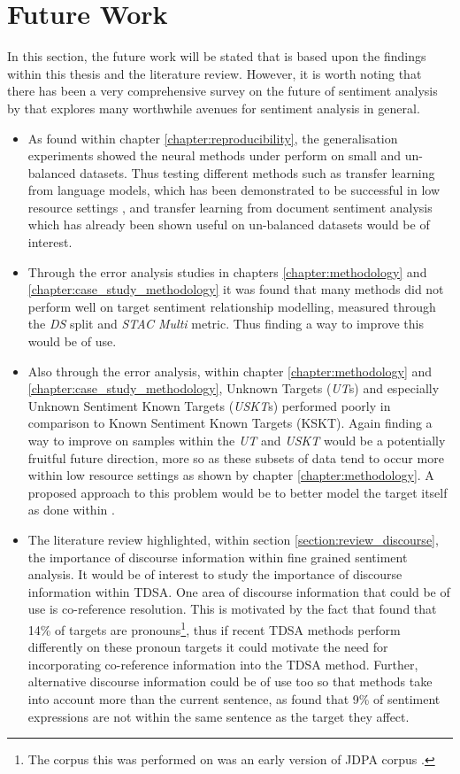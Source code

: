 \section{Future Work}
In this section, the future work will be stated that is based upon the findings within this thesis and the literature review. However, it is worth noting that there has been a very comprehensive survey on the future of sentiment analysis by \citet{poria2020beneath} that explores many worthwhile avenues for sentiment analysis in general.
\begin{itemize}
    \item As found within chapter \ref{chapter:reproducibility}, the generalisation experiments showed the neural methods under perform on small and un-balanced datasets. Thus testing different methods such as transfer learning from language models, which has been demonstrated to be successful in low resource settings \citep{howard-ruder-2018-universal}, and transfer learning from document sentiment analysis which has already been shown useful on un-balanced datasets \citep{he-etal-2018-exploiting} would be of interest.
    \item Through the error analysis studies in chapters \ref{chapter:methodology} and \ref{chapter:case_study_methodology} it was found that many methods did not perform well on target sentiment relationship modelling, measured through the \textit{DS} split and \textit{STAC Multi} metric. Thus finding a way to improve this would be of use.
    \item Also through the error analysis, within chapter \ref{chapter:methodology} and \ref{chapter:case_study_methodology}, Unknown Targets (\textit{UT}s) and especially Unknown Sentiment Known Targets (\textit{USKT}s) performed poorly in comparison to Known Sentiment Known Targets (KSKT). Again finding a way to improve on samples within the \textit{UT} and \textit{USKT} would be a potentially fruitful future direction, more so as these subsets of data tend to occur more within low resource settings as shown by chapter \ref{chapter:methodology}. A proposed approach to this problem would be to better model the target itself as done within \citet{he-etal-2018-effective}.
    \item The literature review highlighted, within section \ref{section:review_discourse}, the importance of discourse information within fine grained sentiment analysis. It would be of interest to study the importance of discourse information within TDSA. One area of discourse information that could be of use is co-reference resolution. This is motivated by the fact that \citet{kessler2009targeting} found that 14\% of targets are pronouns\footnote{The corpus this was performed on was an early version of JDPA corpus \citep{kessler2010icwsm}.}, thus if recent TDSA methods perform differently on these pronoun targets it could motivate the need for incorporating co-reference information into the TDSA method. Further, alternative discourse information could be of use too so that methods take into account more than the current sentence, as \citet{kessler2010icwsm} found that 9\% of sentiment expressions are not within the same sentence as the target they affect.

\end{itemize}
